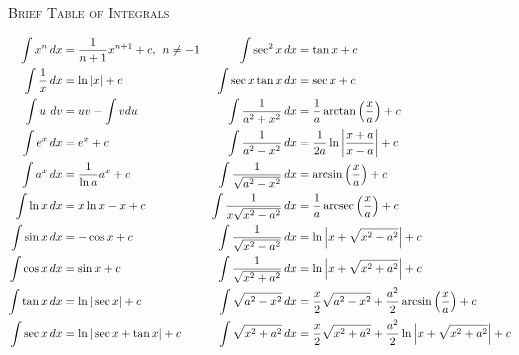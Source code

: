 \newcommand{\dd}{\,d}
\newcommand{\dx}{\,dx}

\centerline{\textsc{Brief Table of Integrals} \hspace{30mm}}

\begin{align*}
\int x^n \dx &= \frac{1}{n+1}x^{n+1}+c, \hspace{1ex} n\neq-1 &
   \int \sec^2 x \dx &= \tan x + c \\
\int \frac{1}{x}\dx &= \ln |x| + c &
   \int \sec x \tan x \dx &= \sec x + c \\
\int u \hspace{2pt} \dd{v} &= uv - \int v du &
   \int \frac{1}{a^2+x^2}\dx &= \frac{1}{a} \arctan\left(\frac{x}{a}\right) + c \\
\int e^x \dx &= e^x + c &
   \int \frac{1}{a^2-x^2}\dx &= \frac{1}{2a}\ln\left|\frac{x+a}{x-a}\right| + c \\
\int a^x \dx &= \frac{1}{\ln a} a^x + c &
   \int \frac{1}{\sqrt{a^2-x^2}} \dx &= \arcsin\left(\frac{x}{a}\right) + c \\
\int \ln x \dx &= x \ln x - x + c &
   \int \frac{1}{x \sqrt{x^2-a^2}} \dx &= \frac{1}{a} \operatorname{arcsec}\left(\frac{x}{a}\right) + c \\
\int \sin x \dx &= -\cos x + c &
   \int \frac{1}{\sqrt{x^2-a^2}} \dx &= \ln\left|x+\sqrt{x^2-a^2}\right| + c  \\
\int \cos x \dx &= \sin x + c &
   \int \frac{1}{\sqrt{x^2+a^2}} \dx &= \ln\left|x+\sqrt{x^2+a^2}\right| + c \\
\int \tan x \dx &= \ln |\sec x| + c &
   \int \sqrt{a^2-x^2} \dx &= \frac{x}{2} \sqrt{a^2-x^2} + \frac{a^2}{2} \arcsin\left(\frac{x}{a}\right) + c \\
\int \sec x \dx &= \ln |\sec x + \tan x| + c &
   \int \sqrt{x^2+a^2} \dx &= \frac{x}{2} \sqrt{x^2+a^2} + \frac{a^2}{2} \ln\left|x+\sqrt{x^2+a^2}\right| + c
\end{align*}
